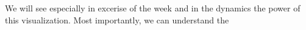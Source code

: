 We will see especially in excerise of the week and in the dynamics the power of this visualization. Most importantly, we can understand the 
